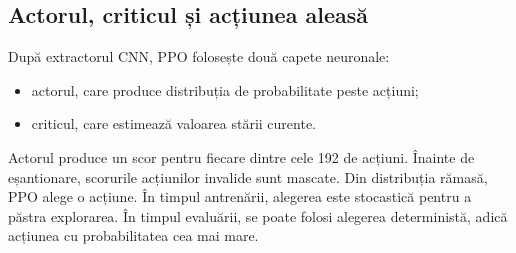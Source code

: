 \documentclass[12pt,a4paper]{article}
\begin{document}
\begin{table}[H]
    \centering
    \caption{Fluxul tensorilor în extractorul CNN de bază pentru varianta principală 8x8.}
    \label{tab:cnn-flow}
\end{table}

\subsection{Actorul, criticul și acțiunea aleasă}

După extractorul CNN, PPO folosește două capete neuronale:
\begin{itemize}
    \item actorul, care produce distribuția de probabilitate peste acțiuni;
    \item criticul, care estimează valoarea stării curente.
\end{itemize}

Actorul produce un scor pentru fiecare dintre cele 192 de acțiuni. Înainte de eșantionare, scorurile acțiunilor invalide sunt mascate. Din distribuția rămasă, PPO alege o acțiune. În timpul antrenării, alegerea este stocastică pentru a păstra explorarea. În timpul evaluării, se poate folosi alegerea deterministă, adică acțiunea cu probabilitatea cea mai mare.
\end{document}
